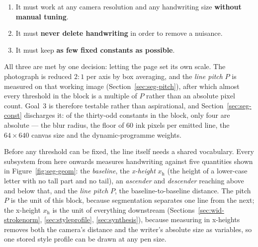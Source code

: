 \begin{enumerate}
\item It must work at any camera resolution and any handwriting size \textbf{without manual tuning}.
\item It must \textbf{never delete handwriting} in order to remove a nuisance.
\item It must keep \textbf{as few fixed constants as possible}.
\end{enumerate}

All three are met by one decision: letting the page set its own scale. The photograph is reduced $2{:}1$ per axis by box averaging, and the \emph{line pitch} $P$ is measured on that working image (Section~\ref{sec:seg-pitch}), after which almost every threshold in the block is a multiple of $P$ rather than an absolute pixel count. Goal~3 is therefore testable rather than aspirational, and Section~\ref{sec:seg-const} discharges it: of the thirty-odd constants in the block, only four are absolute --- the blur radius, the floor of 60 ink pixels per emitted line, the $64\times640$ canvas size and the dynamic-programme weights.

Before any threshold can be fixed, the line itself needs a shared vocabulary. Every subsystem from here onwards measures handwriting against five quantities shown in Figure~\ref{fig:seg-geom}: the \emph{baseline}, the \emph{x-height} $x_{\mathrm h}$ (the height of a lower-case letter with no tall part and no tail), an \emph{ascender} and \emph{descender} reaching above and below that, and the \emph{line pitch} $P$, the baseline-to-baseline distance. The pitch $P$ is the unit of this block, because segmentation separates one line from the next; the x-height $x_{\mathrm h}$ is the unit of everything downstream (Sections~\ref{sec:wid-strokenorm}, \ref{sec:styleprofile}, \ref{sec:synthesis}), because measuring in x-heights removes both the camera's distance and the writer's absolute size as variables, so one stored style profile can be drawn at any pen size.

